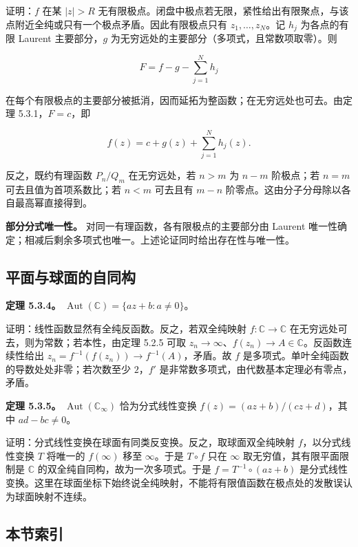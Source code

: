 \documentclass[11pt,a4paper]{article}
\begin{document}
证明：\(f\) 在某 \(|z|>R\)
无有限极点。闭盘中极点若无限，紧性给出有限聚点，与该点附近全纯或只有一个极点矛盾。因此有限极点只有
\(z_1,\ldots,z_N\)。记 \(h_j\) 为各点的有限 Laurent 主要部分，\(g\)
为无穷远处的主要部分（多项式，且常数项取零）。则

\[
F=f-g-\sum_{j=1}^N h_j
\]

在每个有限极点的主要部分被抵消，因而延拓为整函数；在无穷远处也可去。由定理
5.3.1，\(F=c\)，即

\[
f(z)=c+g(z)+\sum_{j=1}^N h_j(z).
\]

反之，既约有理函数 \(P_n/Q_m\) 在无穷远处，若 \(n>m\) 为 \(n-m\)
阶极点；若 \(n=m\) 可去且值为首项系数比；若 \(n<m\) 可去且有 \(m-n\)
阶零点。这由分子分母除以各自最高幂直接得到。

\textbf{部分分式唯一性。} 对同一有理函数，各有限极点的主要部分由 Laurent
唯一性确定；相减后剩余多项式也唯一。上述论证同时给出存在性与唯一性。

\subsection{平面与球面的自同构}\label{ch05-s3-heading-3}

\textbf{定理 5.3.4。} \(\operatorname{Aut}(\mathbb C)=\{az+b:a\ne0\}\)。

证明：线性函数显然有全纯反函数。反之，若双全纯映射
\(f:\mathbb C\to\mathbb C\) 在无穷远处可去，则为常数；若本性，由定理
5.2.5 可取
\(z_n\to\infty\)、\(f(z_n)\to A\in\mathbb C\)。反函数连续性给出
\(z_n=f^{-1}(f(z_n))\to f^{-1}(A)\)，矛盾。故 \(f\)
是多项式。单叶全纯函数的导数处处非零；若次数至少 \(2\)，\(f'\)
是非常数多项式，由代数基本定理必有零点，矛盾。

\textbf{定理 5.3.5。} \(\operatorname{Aut}(\mathbb C_\infty)\)
恰为分式线性变换 \(f(z)=(az+b)/(cz+d)\)，其中 \(ad-bc\ne0\)。

证明：分式线性变换在球面有同类反变换。反之，取球面双全纯映射
\(f\)，以分式线性变换 \(T\) 将唯一的 \(f(\infty)\) 移至 \(\infty\)。于是
\(T\circ f\) 只在 \(\infty\) 取无穷值，其有限平面限制是 \(\mathbb C\)
的双全纯自同构，故为一次多项式。于是 \(f=T^{-1}\circ(az+b)\)
是分式线性变换。这里在球面坐标下始终说全纯映射，不能将有限值函数在极点处的发散误认为球面映射不连续。

\subsection{本节索引}\label{ch05-s3-heading-4}
\end{document}
